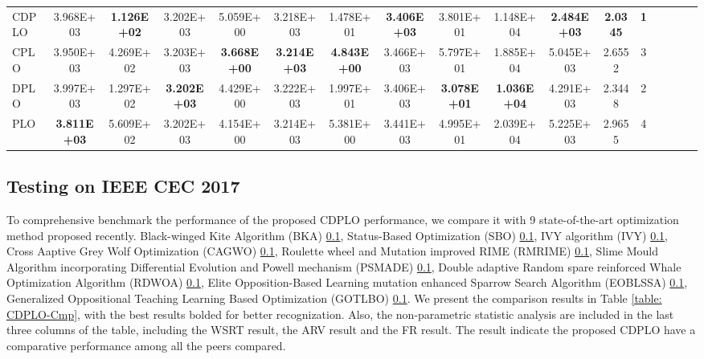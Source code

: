 \documentclass[review]{elsarticle}
\begin{document}
\begin{table}
\begin{tabular}{@{}lcccccccccccccccc@{}}
CDPLO      & 3.968E+03          & \textbf{1.126E+02} & 3.202E+03          & 5.059E+00          & 3.218E+03          & 1.478E+01          & \textbf{3.406E+03} & 3.801E+01          & 1.148E+04          & \textbf{2.484E+03} & \textbf{2.0345}      & \textbf{1}          &                    &                    &                    &                    \\
CPLO       & 3.950E+03          & 4.269E+02          & 3.203E+03          & \textbf{3.668E+00} & \textbf{3.214E+03} & \textbf{4.843E+00} & 3.466E+03          & 5.797E+01          & 1.885E+04          & 5.045E+03          & 2.6552               & 3                   &                    &                    &                    &                    \\
DPLO       & 3.997E+03          & 1.297E+02          & \textbf{3.202E+03} & 4.429E+00          & 3.222E+03          & 1.997E+01          & 3.406E+03          & \textbf{3.078E+01} & \textbf{1.036E+04} & 4.291E+03          & 2.3448               & 2                   &                    &                    &                    &                    \\
PLO        & \textbf{3.811E+03} & 5.609E+02          & 3.202E+03          & 4.154E+00          & 3.214E+03          & 5.381E+00          & 3.441E+03          & 4.995E+01          & 2.039E+04          & 5.225E+03          & 2.9655               & 4                   &                    &                    &                    &                   \\ \bottomrule
\end{tabular}
\end{table}

\subsection{Testing on IEEE CEC 2017}
To comprehensive benchmark the performance of the proposed CDPLO performance, we compare it with 9 state-of-the-art optimization method proposed recently. Black-winged Kite Algorithm (BKA) \ref{}, Status-Based Optimization (SBO) \ref{}, IVY algorithm (IVY) \ref{}, Cross Aaptive Grey Wolf Optimization (CAGWO) \ref{}, Roulette wheel and Mutation improved RIME (RMRIME) \ref{}, Slime Mould Algorithm incorporating Differential Evolution and Powell mechanism (PSMADE) \ref{}, Double adaptive Random spare reinforced Whale Optimization Algorithm (RDWOA) \ref{}, Elite Opposition-Based Learning mutation enhanced Sparrow Search Algorithm (EOBLSSA) \ref{}, Generalized Oppositional Teaching Learning Based Optimization (GOTLBO) \ref{}. We present the comparison results in Table \ref{table: CDPLO-Cmp}, with the best results bolded for better recognization. Also, the non-parametric statistic analysis are included in the last three columns of the table, including the WSRT result, the ARV result and the FR result. The result indicate the proposed CDPLO have a comparative performance among all the peers compared.
\end{document}
